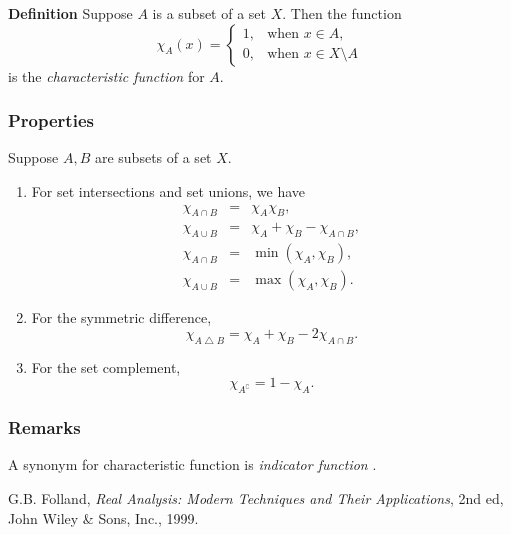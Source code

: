 \documentclass[12pt]{article}
\begin{document}
{\bf Definition} Suppose $A$ is a subset of a set $X$. Then the
function
\begin{equation*}
\chi_A(x) =
\begin{cases}
1,&\text{when }x\in A,\\
0,&\text{when }x\in X\setminus A
\end{cases}
\end{equation*}
is the \emph{characteristic function} for $A$.


\subsubsection{Properties}
Suppose $A,B$ are subsets of a set $X$.
\begin{enumerate}
\item For set intersections and set unions, we have
   \begin{eqnarray*}
   \chi_{A\cap B} &=& \chi_A \chi_B, \\
   \chi_{A\cup B} &=& \chi_A + \chi_B - \chi_{A\cap B},\\
   \chi_{A\cap B} &=& \min(\chi_A,\chi_B),\\
   \chi_{A\cup B} &=& \max(\chi_A,\chi_B).
   \end{eqnarray*}
\item For the symmetric difference,
$$\chi_{A\bigtriangleup B} = \chi_A + \chi_B - 2\chi_{A\cap B}.$$
\item For the set complement,
$$\chi_{A^\complement} = 1-\chi_A. $$
\end{enumerate}


\subsubsection{Remarks}
A synonym for characteristic function is \emph{indicator function}
\cite{folland}.


\begin{thebibliography}{9}
 G.B. Folland, \emph{Real Analysis: Modern Techniques and Their Applications}, 2nd ed, John Wiley \& Sons, Inc., 1999.
 \end{thebibliography}
\end{document}
